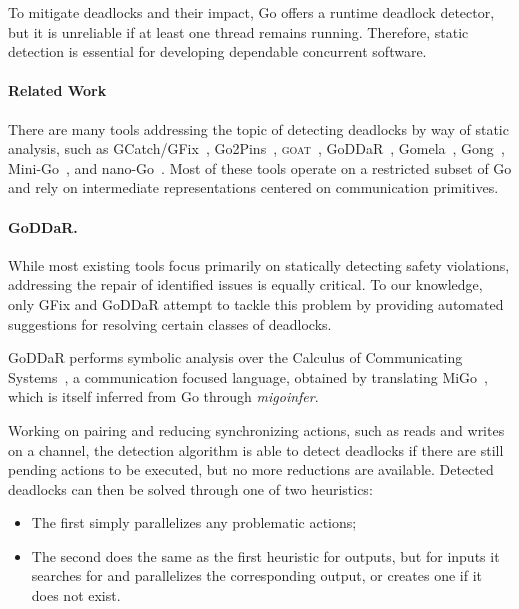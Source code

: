 \documentclass[runningheads]{llncs}
\begin{document}
To mitigate deadlocks and their impact, %
Go offers a runtime deadlock detector, but it is unreliable if at least one thread remains running. Therefore, static detection is essential for developing dependable concurrent software.

\paragraph*{Related Work}
There are many tools addressing the topic of detecting deadlocks by way of static analysis, such as GCatch/GFix~\cite{GCatch}, Go2Pins~\cite{Go2Pins}, \textsc{goat}~\cite{Goat}, GoDDaR~\cite{GoDDaR}, Gomela~\cite{Gomela}, Gong~\cite{Gong}, Mini-Go~\cite{MiniGo_Automata}, and nano-Go~\cite{nanoGo}. 
Most of these tools operate on a restricted subset of Go and rely on intermediate representations centered on communication primitives.

\paragraph*{GoDDaR.}
While most existing tools focus primarily on statically detecting safety violations, addressing the repair of identified issues is equally critical. 
To our knowledge, only GFix and GoDDaR attempt to tackle this problem by providing automated suggestions for resolving certain classes of deadlocks.


GoDDaR performs symbolic analysis over the Calculus of Communicating Systems~\cite{MilnerCCS}, a communication focused language, obtained by translating MiGo~\cite{MiGo}, which is itself inferred from Go through \textit{migoinfer}.

Working on pairing and reducing synchronizing actions, such as reads and writes on a channel, the detection algorithm is able to detect deadlocks if there are still pending actions to be executed, but no more reductions are available.
Detected deadlocks can then be solved through one of two heuristics:
\begin{itemize}
    \item The first simply parallelizes any problematic actions;
    \item The second does the same as the first heuristic for outputs, but for inputs it searches for and parallelizes the corresponding output, or creates one if it does not exist.
\end{itemize}
\end{document}
